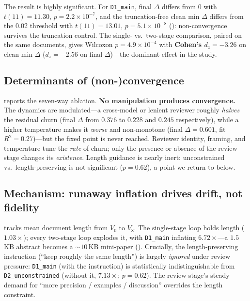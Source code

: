  The result is highly significant. For \texttt{D1\_main}, final
$\Delta$ differs from $0$ with $t(11)=11.30$, $p=2.2\times10^{-7}$, and the truncation-free
clean min $\Delta$ differs from the $0.02$ threshold with $t(11)=13.01$,
$p=5.1\times10^{-8}$ (): non-convergence survives the truncation control.
The single- vs.\ two-stage comparison, paired on the same documents, gives Wilcoxon
$p=4.9\times10^{-4}$ with \textbf{Cohen's $d_z=-3.26$} on clean min $\Delta$ ($d_z=-2.56$ on
final $\Delta$)---the dominant effect in the study.

\subsection{Determinants of (non-)convergence}
\label{sec:ablations}



 reports the seven-way ablation. \textbf{No manipulation produces
convergence.} The dynamics are modulated---a cross-model or lenient reviewer roughly
\emph{halves} the residual churn (final $\Delta$ from $0.376$ to $0.228$ and $0.245$
respectively), while a higher temperature makes it \emph{worse} and non-monotone (final
$\Delta=0.601$, fit $R^2=0.27$)---but the fixed point is never reached. Reviewer identity,
framing, and temperature tune the \emph{rate} of churn; only the presence or absence of the
review stage changes its \emph{existence}. Length guidance is nearly inert: unconstrained vs.\
length-preserving is not significant ($p=0.62$), a point we return to below.

\subsection{Mechanism: runaway inflation drives drift, not fidelity}
\label{sec:mechanism}



  tracks mean document length from $V_0$ to $V_8$.
The single-stage loop holds length ($1.03\times$); every two-stage loop explodes it, with
\texttt{D1\_main} inflating $6.72\times$---a $1.5$\,KB abstract becomes a $\sim 10$\,KB
mini-paper (\figref{fig:length}). Crucially, the length-preserving instruction (``keep roughly
the same length'') is largely \emph{ignored} under review pressure: \texttt{D1\_main} (with the
instruction) is statistically indistinguishable from \texttt{D2\_unconstrained} (without it,
$7.13\times$; $p=0.62$). The review stage's steady demand for ``more precision / examples /
discussion'' overrides the length constraint.

